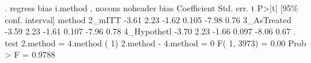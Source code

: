 . regress bias i.method , nocons noheader
         bias {\VBAR} Coefficient  Std. err.      t    P>|t|     [95\% conf. interval]
       method {\VBAR}
      2_mITT  {\VBAR}      -3.61       2.23    -1.62   0.105        -7.98        0.76
 3_AsTreated  {\VBAR}      -3.59       2.23    -1.61   0.107        -7.96        0.78
4_Hypothet{\tytilde}l  {\VBAR}      -3.70       2.23    -1.66   0.097        -8.06        0.67
{\smallskip}
. test 2.method = 4.method
{\smallskip}
 ( 1)  2.method - 4.method = 0
{\smallskip}
       F(  1,  3973) =    0.00
            Prob > F =    0.9788
{\smallskip}
